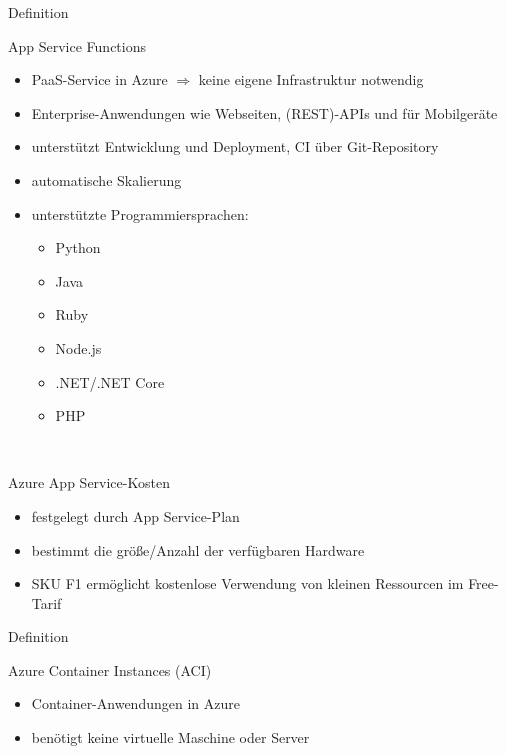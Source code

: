 \documentclass{scrartcl}
\newenvironment{flashcard}[2][]{%
    #1
    \vfill
    \centerline{\Large{#2}}
    \vfill
\newpage
}
{\newpage}
\begin{document}
    \begin{flashcard}[Definition]{App Service Functions}
        \begin{itemize}
            \item PaaS-Service in Azure\newline
            $\Rightarrow$ keine eigene Infrastruktur notwendig
            \item Enterprise-Anwendungen wie Webseiten, (REST)-APIs und für Mobilgeräte
            \item unterstützt Entwicklung und Deployment, CI über Git-Repository
            \item automatische Skalierung
            \item unterstützte Programmiersprachen:
            \begin{itemize}
                \item Python
                \item Java
                \item Ruby
                \item Node.js
                \item .NET/.NET Core
                \item PHP
            \end{itemize}
        \end{itemize}
    \end{flashcard}

    \begin{flashcard}[\ ]{Azure App Service-Kosten}
        \begin{itemize}
            \item festgelegt durch App Service-Plan
            \item bestimmt die größe/Anzahl der verfügbaren Hardware
            \item SKU F1 ermöglicht kostenlose Verwendung von kleinen Ressourcen im Free-Tarif
        \end{itemize}

    \end{flashcard}

    \begin{flashcard}[Definition]{Azure Container Instances (ACI)}
        \begin{itemize}
            \item Container-Anwendungen in Azure
            \item benötigt keine virtuelle Maschine oder Server
        \end{itemize}

    \end{flashcard}
\end{document}
